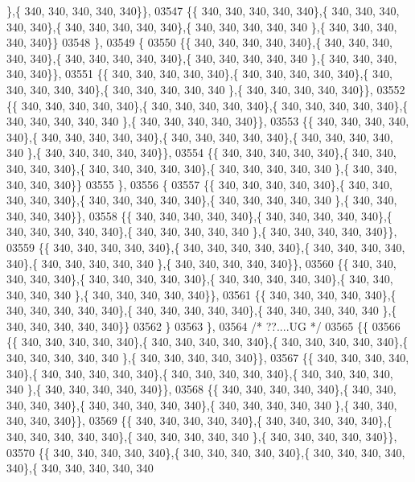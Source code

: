 \begin{DoxyCode}
      \},\{ 340, 340, 340, 340, 340\}\},
03547 \{\{ 340, 340, 340, 340, 340\},\{ 340, 340, 340, 340, 340\},\{ 340, 340, 340, 340, 340\},\{ 340, 340, 340, 340, 340
      \},\{ 340, 340, 340, 340, 340\}\}
03548 \},
03549 \{
03550 \{\{ 340, 340, 340, 340, 340\},\{ 340, 340, 340, 340, 340\},\{ 340, 340, 340, 340, 340\},\{ 340, 340, 340, 340, 340
      \},\{ 340, 340, 340, 340, 340\}\},
03551 \{\{ 340, 340, 340, 340, 340\},\{ 340, 340, 340, 340, 340\},\{ 340, 340, 340, 340, 340\},\{ 340, 340, 340, 340, 340
      \},\{ 340, 340, 340, 340, 340\}\},
03552 \{\{ 340, 340, 340, 340, 340\},\{ 340, 340, 340, 340, 340\},\{ 340, 340, 340, 340, 340\},\{ 340, 340, 340, 340, 340
      \},\{ 340, 340, 340, 340, 340\}\},
03553 \{\{ 340, 340, 340, 340, 340\},\{ 340, 340, 340, 340, 340\},\{ 340, 340, 340, 340, 340\},\{ 340, 340, 340, 340, 340
      \},\{ 340, 340, 340, 340, 340\}\},
03554 \{\{ 340, 340, 340, 340, 340\},\{ 340, 340, 340, 340, 340\},\{ 340, 340, 340, 340, 340\},\{ 340, 340, 340, 340, 340
      \},\{ 340, 340, 340, 340, 340\}\}
03555 \},
03556 \{
03557 \{\{ 340, 340, 340, 340, 340\},\{ 340, 340, 340, 340, 340\},\{ 340, 340, 340, 340, 340\},\{ 340, 340, 340, 340, 340
      \},\{ 340, 340, 340, 340, 340\}\},
03558 \{\{ 340, 340, 340, 340, 340\},\{ 340, 340, 340, 340, 340\},\{ 340, 340, 340, 340, 340\},\{ 340, 340, 340, 340, 340
      \},\{ 340, 340, 340, 340, 340\}\},
03559 \{\{ 340, 340, 340, 340, 340\},\{ 340, 340, 340, 340, 340\},\{ 340, 340, 340, 340, 340\},\{ 340, 340, 340, 340, 340
      \},\{ 340, 340, 340, 340, 340\}\},
03560 \{\{ 340, 340, 340, 340, 340\},\{ 340, 340, 340, 340, 340\},\{ 340, 340, 340, 340, 340\},\{ 340, 340, 340, 340, 340
      \},\{ 340, 340, 340, 340, 340\}\},
03561 \{\{ 340, 340, 340, 340, 340\},\{ 340, 340, 340, 340, 340\},\{ 340, 340, 340, 340, 340\},\{ 340, 340, 340, 340, 340
      \},\{ 340, 340, 340, 340, 340\}\}
03562 \}
03563 \},
03564 \textcolor{comment}{/* ??....UG */}
03565 \{\{
03566 \{\{ 340, 340, 340, 340, 340\},\{ 340, 340, 340, 340, 340\},\{ 340, 340, 340, 340, 340\},\{ 340, 340, 340, 340, 340
      \},\{ 340, 340, 340, 340, 340\}\},
03567 \{\{ 340, 340, 340, 340, 340\},\{ 340, 340, 340, 340, 340\},\{ 340, 340, 340, 340, 340\},\{ 340, 340, 340, 340, 340
      \},\{ 340, 340, 340, 340, 340\}\},
03568 \{\{ 340, 340, 340, 340, 340\},\{ 340, 340, 340, 340, 340\},\{ 340, 340, 340, 340, 340\},\{ 340, 340, 340, 340, 340
      \},\{ 340, 340, 340, 340, 340\}\},
03569 \{\{ 340, 340, 340, 340, 340\},\{ 340, 340, 340, 340, 340\},\{ 340, 340, 340, 340, 340\},\{ 340, 340, 340, 340, 340
      \},\{ 340, 340, 340, 340, 340\}\},
03570 \{\{ 340, 340, 340, 340, 340\},\{ 340, 340, 340, 340, 340\},\{ 340, 340, 340, 340, 340\},\{ 340, 340, 340, 340, 340

\end{DoxyCode}
